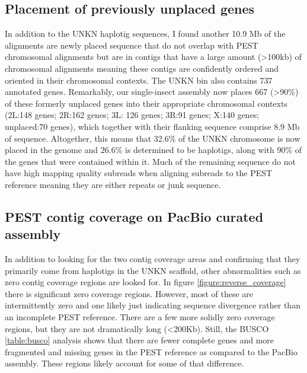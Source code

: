 \subsection{Placement of previously unplaced genes}\label{section:unkn}
\par{
In addition to the UNKN haplotig sequences, I found another 10.9 Mb of the alignments are newly placed sequence that do not overlap with PEST chromosomal alignments but are in contigs that have a large amount (>100kb) of chromosomal alignments meaning these contigs are confidently ordered and oriented in their chromosomal contexts. The UNKN bin also contains 737 annotated genes. Remarkably, our single-insect assembly now places 667 (>90\%) of these formerly unplaced genes into their appropriate chromosomal contexts (2L:148 genes; 2R:162 genes; 3L: 126 genes; 3R:91 genes; X:140 genes; unplaced:70 genes\cite{mosquito_assembly}), which together with their flanking sequence comprise 8.9 Mb of sequence. Altogether, this means that 32.6\% of the UNKN chromosome is now placed in the genome and 26.6\% is determined to be haplotigs, along with 90\% of the genes that were contained within it. Much of the remaining sequence do not have high mapping quality subreads when aligning subreads to the PEST reference meaning they are either repeats or junk sequence.
}

\subsection{PEST contig coverage on PacBio curated assembly}

\par{
In addition to looking for the two contig coverage areas and confirming that they primarily come from haplotigs in the UNKN scaffold, other abnormalities such as zero contig coverage regions are looked for. In figure \ref{figure:reverse_coverage} there is significant zero coverage regions. However, most of these are intermittently zero and one likely just indicating sequence divergence rather than an incomplete PEST reference. There are a few more solidly zero coverage regions, but they are not dramatically long (<200Kb). Still, the BUSCO \ref{table:busco} analysis shows that there are fewer complete genes and more fragmented and missing genes in the PEST reference as compared to the PacBio assembly. These regions likely account for some of that difference.
}


